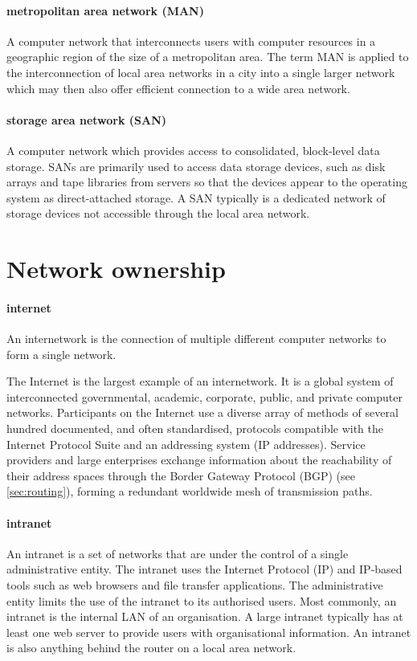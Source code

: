{\paragraph{metropolitan area network (MAN)}
A computer network that interconnects users with computer resources in a geographic region of the size of a metropolitan area.
The term MAN is applied to the interconnection of local area networks in a city into a single larger network which may then also offer efficient connection to a wide area network.

\paragraph{storage area network (SAN)}
A computer network which provides access to consolidated, block-level data storage.
SANs are primarily used to access data storage devices, such as disk arrays and tape libraries from servers so that the devices appear to the operating system as direct-attached storage.
A SAN typically is a dedicated network of storage devices not accessible through the local area network.


\section{Network ownership}
\label{sec:network-ownership}

\paragraph{internet}
An internetwork is the connection of multiple different computer networks to form a single network.

The Internet is the largest example of an internetwork.
It is a global system of interconnected governmental, academic, corporate, public, and private computer networks.
Participants on the Internet use a diverse array of methods of several hundred documented, and often standardised, protocols compatible with the Internet Protocol Suite and an addressing system (IP addresses).
Service providers and large enterprises exchange information about the reachability of their address spaces through the Border Gateway Protocol (BGP) (see \vref{sec:routing}), forming a redundant worldwide mesh of transmission paths.

\paragraph{intranet}
An intranet is a set of networks that are under the control of a single administrative entity.
The intranet uses the Internet Protocol (IP) and IP-based tools such as web browsers and file transfer applications.
The administrative entity limits the use of the intranet to its authorised users.
Most commonly, an intranet is the internal LAN of an organisation.
A large intranet typically has at least one web server to provide users with organisational information.
An intranet is also anything behind the router on a local area network.

}
